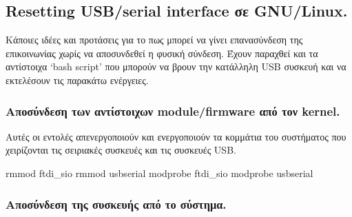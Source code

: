 \documentclass[
  a4paper,
  twoside,
  titlepage,
  11pt]{article}
\newenvironment{Shaded}{\begin{snugshade}}{\end{snugshade}}
\newcommand{\AttributeTok}[1]{\textcolor[rgb]{0.77,0.63,0.00}{#1}}
\newcommand{\CommentTok}[1]{\textcolor[rgb]{0.56,0.35,0.01}{\textit{#1}}}
\newcommand{\ExtensionTok}[1]{#1}
\newcommand{\FunctionTok}[1]{\textcolor[rgb]{0.00,0.00,0.00}{#1}}
\newcommand{\NormalTok}[1]{#1}
\newcommand{\VariableTok}[1]{\textcolor[rgb]{0.00,0.00,0.00}{#1}}
\numberwithin{equation}{section}
\numberwithin{figure}{section}
\numberwithin{table}{section}
\begin{document}
\begin{Shaded}
\end{Shaded}

\hypertarget{resetting-usbserial-interface-ux3c3ux3b5-gnulinux.}{%
\subsection{Resetting USB/serial interface σε GNU/Linux.}\label{resetting-usbserial-interface-ux3c3ux3b5-gnulinux.}}

Κάποιες ιδέες και προτάσεις για το πως μπορεί να γίνει επανασύνδεση της επικοινωνίας χωρίς να αποσυνδεθεί η φυσική σύνδεση. Έχουν παραχθεί και τα αντίστοιχα `bash script' που μπορούν να βρουν την κατάλληλη USB συσκευή και να εκτελέσουν τις παρακάτω ενέργειες.

\hypertarget{ux3b1ux3c0ux3bfux3c3ux3cdux3bdux3b4ux3b5ux3c3ux3b7-ux3c4ux3c9ux3bd-ux3b1ux3bdux3c4ux3afux3c3ux3c4ux3bfux3b9ux3c7ux3c9ux3bd-modulefirmware-ux3b1ux3c0ux3cc-ux3c4ux3bfux3bd-kernel.}{%
\subsubsection{Αποσύνδεση των αντίστοιχων module/firmware από τον kernel.}\label{ux3b1ux3c0ux3bfux3c3ux3cdux3bdux3b4ux3b5ux3c3ux3b7-ux3c4ux3c9ux3bd-ux3b1ux3bdux3c4ux3afux3c3ux3c4ux3bfux3b9ux3c7ux3c9ux3bd-modulefirmware-ux3b1ux3c0ux3cc-ux3c4ux3bfux3bd-kernel.}}

Αυτές οι εντολές απενεργοποιούν και ενεργοποιούν τα κομμάτια του συστήματος που χειρίζονται τις σειριακές συσκευές και τις συσκευές USB.

\begin{Shaded}
\begin{Highlighting}[]
\ExtensionTok{rmmod}\NormalTok{  ftdi\_sio}
\ExtensionTok{rmmod}\NormalTok{  usbserial}
\ExtensionTok{modprobe}\NormalTok{ ftdi\_sio}
\ExtensionTok{modprobe}\NormalTok{ usbserial}
\end{Highlighting}
\end{Shaded}

\hypertarget{ux3b1ux3c0ux3bfux3c3ux3cdux3bdux3b4ux3b5ux3c3ux3b7-ux3c4ux3b7ux3c2-ux3c3ux3c5ux3c3ux3baux3b5ux3c5ux3aeux3c2-ux3b1ux3c0ux3cc-ux3c4ux3bf-ux3c3ux3cdux3c3ux3c4ux3b7ux3bcux3b1.}{%
\subsubsection{Αποσύνδεση της συσκευής από το σύστημα.}\label{ux3b1ux3c0ux3bfux3c3ux3cdux3bdux3b4ux3b5ux3c3ux3b7-ux3c4ux3b7ux3c2-ux3c3ux3c5ux3c3ux3baux3b5ux3c5ux3aeux3c2-ux3b1ux3c0ux3cc-ux3c4ux3bf-ux3c3ux3cdux3c3ux3c4ux3b7ux3bcux3b1.}}
\end{document}
